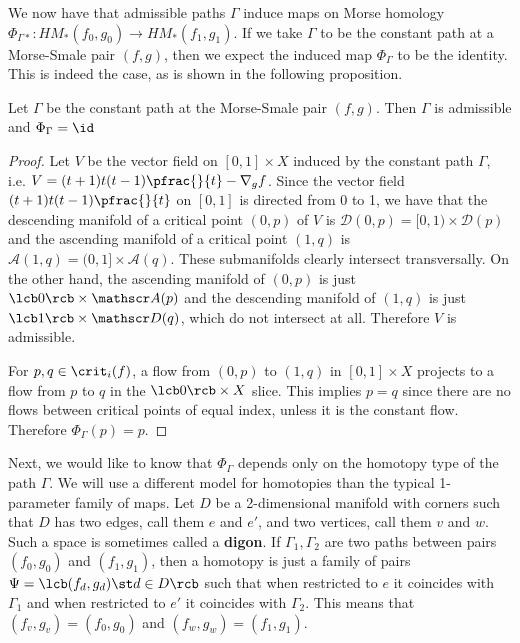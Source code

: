 We now have that admissible paths $\Gamma$ induce maps on Morse homology $\Phi_{\Gamma*} : HM_*(f_0,g_0) \rightarrow HM_*(f_1,g_1)$. If we take $\Gamma$ to be the constant path at a Morse-Smale pair $(f,g)$, then we expect the induced map $\Phi_\Gamma$ to be the identity. This is indeed the case, as is shown in the following proposition.
\begin{prop}
\label{constant path induces identity}
Let $\Gamma$ be the constant path at the Morse-Smale pair $(f,g)$. Then $\Gamma$ is admissible and $\Phi_\Gamma = \id$
\end{prop}
\begin{proof}
Let $V$ be the vector field on $[0,1] \times X$ induced by the constant path $\Gamma$, i.e. $V = (t+1)t(t-1) \pfrac{}{t} - \nabla_g f$. Since the vector field $(t+1)t(t-1) \pfrac{}{t}$ on $[0,1]$ is directed from 0 to 1, we have that the descending manifold of a critical point $(0,p)$ of $V$ is $\mathscr D(0,p)=[0,1) \times \mathscr D(p)$ and the ascending manifold of a critical point $(1,q)$ is $\mathscr A(1,q) = (0,1] \times \mathscr A(q)$. These submanifolds clearly intersect transversally. On the other hand, the ascending manifold of $(0,p)$ is just $\lcb 0 \rcb \times \mathscr A(p)$ and the descending manifold of $(1,q)$ is just $\lcb 1 \rcb \times \mathscr D(q)$, which do not intersect at all. Therefore $V$ is admissible.

For $p,q \in \crit_i(f)$, a flow from $(0,p)$ to $(1,q)$ in $[0,1] \times X$ projects to a flow from $p$ to $q$ in the $\lcb 0 \rcb \times X$ slice. This implies $p=q$ since there are no flows between critical points of equal index, unless it is the constant flow. Therefore $\Phi_\Gamma(p)=p$.
\end{proof}

Next, we would like to know that $\Phi_\Gamma$ depends only on the homotopy type of the path $\Gamma$. We will use a different model for homotopies than the typical 1-parameter family of maps. Let $D$ be a 2-dimensional manifold with corners such that $D$ has two edges, call them $e$ and $e'$, and two vertices, call them $v$ and $w$. Such a space is sometimes called a \textbf{digon}. If $\Gamma_1,\Gamma_2$ are two paths between pairs $(f_0,g_0)$ and $(f_1,g_1)$, then a homotopy is just a family of pairs $\Psi = \lcb (f_d,g_d) \st d \in D \rcb$ such that when restricted to $e$ it coincides with $\Gamma_1$ and when restricted to $e'$ it coincides with $\Gamma_2$. This means that $(f_v,g_v)=(f_0,g_0)$ and $(f_w,g_w)=(f_1,g_1)$.

